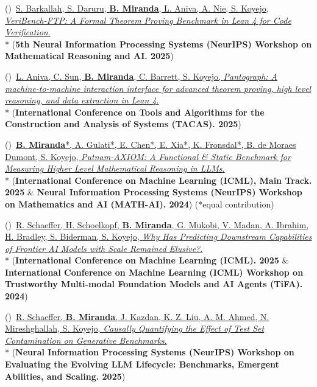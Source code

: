 \documentclass{article}
\newenvironment{changemargin}[2]{%
  \begin{list}{}{%
    \setlength{\topsep}{0pt}%
    \setlength{\leftmargin}{#1}%
    \setlength{\rightmargin}{#2}%
    \setlength{\listparindent}{\parindent}%
    \setlength{\itemindent}{\parindent}%
    \setlength{\parsep}{\parskip}%
  }%
  \item[]}{\end{list}
}
\newenvironment{body} {
		\vspace*{-16pt}
		\begin{changemargin}{-0.25in}{-0.5in}
	  }
		{\end{changemargin}\vspace{8pt plus 12pt}
	}
\newcounter{pubnum}
\newcommand{\pubitem}{\stepcounter{pubnum}(\thepubnum)~}
\begin{document}
\begin{body}
    \vspace{10pt}
    \pubitem \href{https://openreview.net/forum?id=wDjOpXKgtU}
    {S. Barkallah, S. Daruru, \textbf{B. Miranda}, L. Aniva, A. Nie, S. Koyejo,
    \emph{VeriBench-FTP: A Formal Theorem Proving Benchmark in Lean 4 for Code Verification}.}
    \\*
    (\textbf{5th Neural Information Processing Systems (NeurIPS) Workshop on Mathematical Reasoning and AI. 2025})

    \pubitem \href{https://link.springer.com/chapter/10.1007/978-3-031-90643-5_6}
    {L. Aniva, C. Sun, \textbf{B. Miranda}, C. Barrett, S. Koyejo,
    \emph{Pantograph: A machine-to-machine interaction interface for advanced theorem proving, high level reasoning, and data extraction in Lean 4}.}
    \\*
    (\textbf{International Conference on Tools and Algorithms for the Construction and Analysis of Systems (TACAS). 2025})

    \vspace{10pt}
    \pubitem \href{https://openreview.net/forum?id=kqj2Cn3Sxr}
    {\textbf{B. Miranda}*, A. Gulati*, E. Chen*, E. Xia*, K. Fronsdal*, B. de Moraes Dumont, S. Koyejo,
    \emph{Putnam-AXIOM: A Functional \& Static Benchmark for Measuring Higher Level Mathematical Reasoning in LLMs}.}
    \\*
    (\textbf{International Conference on Machine Learning (ICML), Main Track. 2025} \& \textbf{Neural Information Processing Systems (NeurIPS) Workshop on Mathematics and AI (MATH-AI). 2024}) (*equal contribution)

    \vspace{10pt}
    \pubitem \href{https://arxiv.org/pdf/2406.04391}
    {R. Schaeffer, H. Schoelkopf, \textbf{B. Miranda}, G. Mukobi, V. Madan, A. Ibrahim, H. Bradley, S. Biderman, S. Koyejo,
    \emph{Why Has Predicting Downstream Capabilities of Frontier AI Models with Scale Remained Elusive?}.}
    \\*
    (\textbf{International Conference on Machine Learning (ICML). 2025} \& \textbf{International Conference on Machine Learning (ICML) Workshop on Trustworthy Multi-modal Foundation Models and AI Agents (TiFA). 2024})

    \vspace{10pt}
    \pubitem \href{https://openreview.net/forum?id=RsmjshBEDP}
    {R. Schaeffer, \textbf{B. Miranda}, J. Kazdan, K. Z. Liu, A. M. Ahmed, N. Mireshghallah, S. Koyejo,
    \emph{Causally Quantifying the Effect of Test Set Contamination on Generative Benchmarks}.}
    \\*
    (\textbf{Neural Information Processing Systems (NeurIPS) Workshop on Evaluating the Evolving LLM Lifecycle: Benchmarks, Emergent Abilities, and Scaling. 2025})


\end{body}
\end{document}
